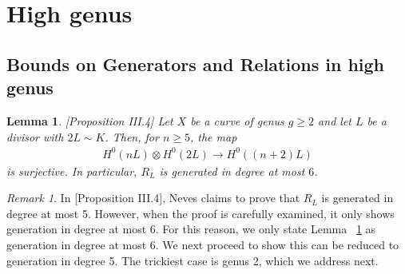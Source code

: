 \documentclass{amsart}
\theoremstyle{plain}
\newtheorem{lem}[thm]{Lemma}
\theoremstyle{definition}
\theoremstyle{remark}
\newtheorem{rem}[thm]{Remark}
\numberwithin{equation}{section}
\newcommand\ssec{\subsection}
\newcommand\im{\text{im }}
\begin{document}









\section{High genus}

\ssec{Bounds on Generators and Relations in high genus}

\begin{lem}
\label{lem:semicanonical_generation} \cite{neves:halfcan}[Proposition III.4]
Let $X$ be a curve of genus $g \geq 2$ and let $L$ be a divisor with $2 L \sim K$. Then, for $n \geq 5$, the map
\begin{align*}
	H^0(nL) \otimes H^0(2L) \rightarrow H^0((n+2)L)
\end{align*}
is surjective.
In particular, $R_L$ is generated in degree at most $6$.
\end{lem}

\begin{rem}
In \cite{neves:halfcan}[Proposition III.4], Neves claims to prove that $R_L$ is generated in degree at most 5. However, when the proof is carefully examined, it only shows generation in degree at most 6. For this reason, we only state Lemma ~\ref{lem:semicanonical_generation} as generation in degree at most 6. We next proceed to show this can be reduced to generation in degree 5. The trickiest case is genus 2, which we address next.
\end{rem}
\end{document}
